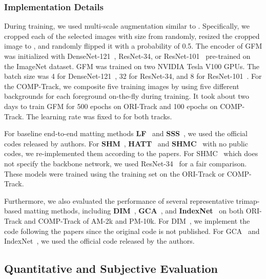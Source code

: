 \documentclass[twocolumn]{svjour3}
\begin{document}
\subsubsection{Implementation Details} During training, we used multi-scale augmentation similar to \citep{xu2017deep}. Specifically, we cropped each of the selected images with size from  randomly, resized the cropped image to , and randomly flipped it with a probability of 0.5. The encoder of GFM was initialized with DenseNet-121~\citep{huang2017densely}, ResNet-34, or ResNet-101~\citep{he2016deep} pre-trained on the ImageNet dataset. GFM was trained on two NVIDIA Tesla V100 GPUs. The batch size was 4 for DenseNet-121~\citep{huang2017densely}, 32 for ResNet-34, and 8 for ResNet-101~\citep{he2016deep}. For the COMP-Track, we composite five training images by using five different backgrounds for each foreground on-the-fly during training. It took about two days to train GFM for 500 epochs on ORI-Track and 100 epochs on COMP-Track. The learning rate was fixed to  for both tracks.

For baseline end-to-end matting methods \textbf{LF}~\citep{zhang2019late} and \textbf{SSS}~\citep{aksoy2018semantic}, we used the official codes released by authors. For \textbf{SHM}~\citep{chen2018semantic}, \textbf{HATT}~\citep{Qiao_2020_CVPR} and \textbf{SHMC}~\citep{liu2020boosting} with no public codes, we re-implemented them according to the papers. For SHMC~\citep{liu2020boosting} which does not specify the backbone network, we used ResNet-34~\citep{he2016deep} for a fair comparison. These models were trained using the training set on the ORI-Track or COMP-Track.

Furthermore, we also evaluated the performance of several representative trimap-based matting methods, including \textbf{DIM}~\citep{xu2017deep}, \textbf{GCA}~\citep{li2020natural}, and \textbf{IndexNet}~\citep{hao2019indexnet} on both ORI-Track and COMP-Track of AM-2k and PM-10k. For DIM~\citep{xu2017deep}, we implement the code following the papers since the original code is not published. For GCA~\citep{li2020natural} and IndexNet~\citep{hao2019indexnet}, we used the official code released by the authors.



\subsection{Quantitative and Subjective Evaluation}
\end{document}

